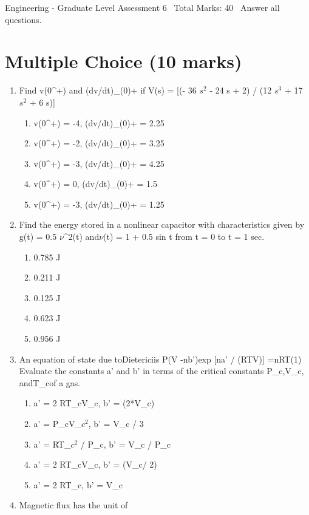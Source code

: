 \documentclass[12pt]{article}
\begin{document}
\begin{center}
Engineering - Graduate Level Assessment 6 \
Total Marks: 40 \
Answer all questions.
\end{center}

\section*{Multiple Choice (10 marks)}
\begin{enumerate}[label=\arabic*.]
\item Find v(0^+) and (dv/dt)\_(0)+ if V(s) = [(- 36 $s^2$ - 24 s + 2) / (12 $s^3$ + 17 $s^2$ + 6 s)]
\begin{enumerate}[label=(\alph*)]
    \item v(0^+) = -4, (dv/dt)\_(0)+ = 2.25
    \item v(0^+) = -2, (dv/dt)\_(0)+ = 3.25
    \item v(0^+) = -3, (dv/dt)\_(0)+ = 4.25
    \item v(0^+) = 0, (dv/dt)\_(0)+ = 1.5
    \item v(0^+) = -3, (dv/dt)\_(0)+ = 1.25
\end{enumerate}
\item Find the energy stored in a nonlinear capacitor with characteristics given by g(t) = 0.5 \ensuremath{\nu}^2(t) and\ensuremath{\nu}(t) = 1 + 0.5 sin t from t = 0 to t = 1 sec.
\begin{enumerate}[label=(\alph*)]
    \item 0.785 J
    \item 0.211 J
    \item 0.125 J
    \item 0.623 J
    \item 0.956 J
\end{enumerate}
\item An equation of state due toDietericiis P(V -nb')exp [na' / (RTV)] =nRT(1) Evaluate the constants a' and b' in terms of the critical constants P\_c,V\_c, andT\_cof a gas.
\begin{enumerate}[label=(\alph*)]
    \item a' = 2 RT\_cV\_c, b' = (2*V\_c)
    \item a' = P\_cV\_$c^2$, b' = V\_c / 3
    \item a' = RT\_$c^2$ / P\_c, b' = V\_c / P\_c
    \item a' = 2 RT\_cV\_c, b' = (V\_c/ 2)
    \item a' = 2 RT\_c, b' = V\_c
\end{enumerate}
\item Magnetic flux has the unit of

\end{enumerate}
\end{document}
